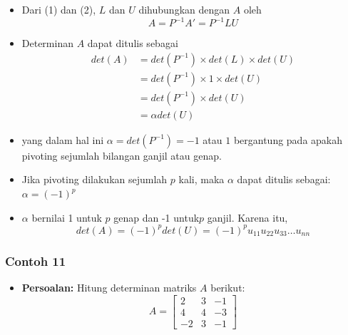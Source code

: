 \documentclass[pdflatex,compress,mathserif]{beamer}
\begin{document}
\begin{frame}
	\begin{itemize}
		\item Dari (1) dan (2), $ L $ dan $ U $ dihubungkan dengan $ A $ oleh
		\[ A = P^{-1} A' = P^{-1} LU \]
		\item Determinan $ A $ dapat ditulis sebagai
		\begin{align*}
			det(A) &= det(P^{-1}) \times det(L) \times det(U) \\
			&= det(P^{-1}) \times 1 \times det(U) \\
			&= det(P^{-1}) \times det(U) \\
			&= \alpha det(U)
		\end{align*}
		\item yang dalam hal ini $ \alpha = det(P^{-1}) = -1 $ atau $ 1 $ bergantung pada apakah pivoting sejumlah bilangan ganjil atau genap.
	\end{itemize}
\end{frame}

\begin{frame}
	\begin{itemize}
		\item Jika pivoting dilakukan sejumlah $ p $ kali, maka $\alpha$ dapat ditulis sebagai:
		$ \alpha = (-1)^p $
		\item $\alpha$ bernilai 1 untuk $ p $ genap dan -1 untuk$  p $ ganjil. Karena itu,
		\[ det(A) = (-1)^pdet(U) = (-1)^p u_{11} u_{22} u_{33} \dots u_{nn} \]
	\end{itemize}
\end{frame}

\begin{frame}
	\frametitle{Contoh 11}
	\begin{itemize}
		\item \textbf{Persoalan:} Hitung determinan matriks $ A $ berikut:
		\[ A = \begin{bmatrix}
		2 & 3 & -1 \\ 4 & 4 & -3 \\ -2 & 3 & -1
		\end{bmatrix} \]
	\end{itemize}
\end{frame}
\end{document}
